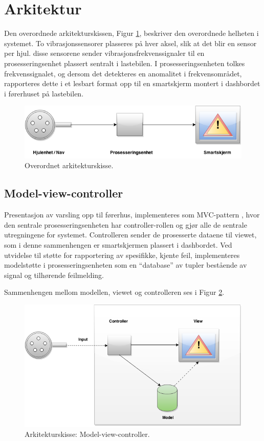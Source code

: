 \section{Arkitektur}
Den overordnede arkitekturskissen, Figur \ref{fig:overordnet-ark}, 
beskriver den overordnede helheten i systemet. To vibrasjonssensorer plasseres
på hver aksel, slik at det blir en sensor per hjul. disse sensorene sender 
vibrasjonsfrekvenssignaler til en prosesseringsenhet plassert sentralt i lastebilen. 
I prosesseringsenheten tolkes frekvenssignalet, og dersom det detekteres en 
anomalitet i frekvensområdet, rapporteres dette i et lesbart format opp til en 
smartskjerm montert i dashbordet i førerhuset på lastebilen.
\newline
\begin{figure}[H]
	\centering
	\includegraphics[width=1.00\textwidth]{images/arkitektur-overordnet.png}
	\caption{Overordnet arkitekturskisse.}
	\label{fig:overordnet-ark}
\end{figure}

\subsection{Model-view-controller}
\label{sec:arkitektur}
Presentasjon av varsling opp til førerhus, implementeres som MVC-pattern \cite{MVC}, 
hvor den sentrale prosesseringsenheten har controller-rollen og gjør alle 
de sentrale utregningene for systemet. Controlleren sender de prosesserte 
dataene til viewet, som i denne sammenhengen er smartskjermen plassert i 
dashbordet. Ved utvidelse til støtte for rapportering av spesifikke, 
kjente feil, implementeres modelstøtte i prosesseringsenheten som en 
``database'' av tupler bestående av signal og tilhørende feilmelding. 

Sammenhengen mellom modellen, viewet og controlleren ses i Figur \ref{fig:mvc}.
\newline
\begin{figure}[H]
	\centering
	\includegraphics[width=1.00\textwidth]{images/architecture2-mvc.png}
	\caption{Arkitekturskisse: Model-view-controller.}
	\label{fig:mvc}
\end{figure}
